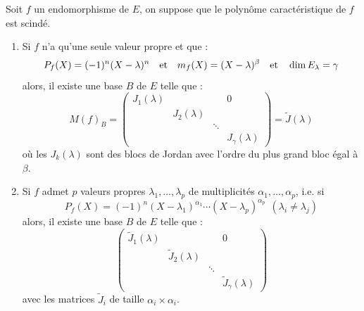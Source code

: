 \documentclass{article}
\begin{document}
\begin{thm}[de Jordan]
Soit $f$ un endomorphisme de $E$, on suppose que le polynôme caractéristique de $f$ est scindé.

\begin{enumerate}

\item
Si $f$ n'a qu'une seule valeur propre et que :
\[ P_f(X) = (-1)^n(X-\lambda)^n \quad \text{et} \quad m_f(X) = (X-\lambda)^{\beta} \quad \text{et} \quad \dim{E_{\lambda}} = \gamma \]
alors, il existe une base $B$ de $E$ telle que :
\[ M(f)_{B} =
\begin{pmatrix}
J_1(\lambda) & & & 0 \\
 & J_2(\lambda) & & \\
 & & \ddots & \\
 & & & J_{\gamma}(\lambda)
\end{pmatrix} = \tilde{J}(\lambda) \] 
où les $J_k(\lambda)$ sont des blocs de Jordan avec l'ordre du plus grand bloc égal à $\beta$.

\item
Si $f$ admet $p$ valeurs propres $\lambda_1, \dots, \lambda_p$ de multiplicités $\alpha_1,\dots, \alpha_p$, i.e. si
\[ P_f(X) = (-1)^n(X-\lambda_1)^{\alpha_1} \cdots (X-\lambda_p)^{\alpha_p} ~~ (\lambda_i \neq \lambda_j) \]
alors, il existe une base $B$ de $E$ telle que :
\[ \begin{pmatrix}
\tilde{J}_1(\lambda) & & & 0 \\
 & \tilde{J}_2(\lambda) & & \\
 & & \ddots & \\
 & & & \tilde{J}_{\gamma}(\lambda)
\end{pmatrix} \]
avec les matrices $\tilde{J}_i$ de taille $\alpha_i \times \alpha_i$.
\end{enumerate}
\end{thm}
\end{document}
